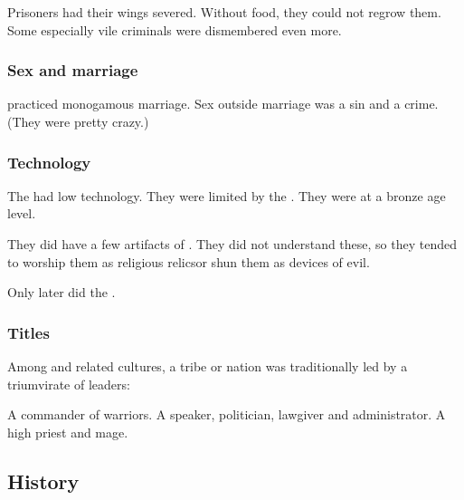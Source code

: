 Prisoners had their wings severed.
Without food, they could not regrow them. 
Some especially vile criminals were dismembered even more. 





\subsubsection{Sex and marriage}
\Merkyrah{} practiced monogamous marriage.
Sex outside marriage was a sin and a crime. 
(They were pretty crazy.) 





\subsubsection{Technology}
The \Merkyrans{} had low technology.
They were limited by the .
They were at a bronze age level. 

They did have a few artifacts of . 
They did not understand these, so they tended to worship them as religious relics\dash or shun them as devices of evil. 

Only later did the \resphain{} . 





\subsubsection{Titles}
Among \Merkyrah and related cultures, a tribe or nation was traditionally led by a triumvirate of leaders: 
\begin{gloss}
   A commander of warriors.
   A speaker, politician, lawgiver and administrator.
   A high priest and mage. 
\end{gloss}









\subsection{History}





